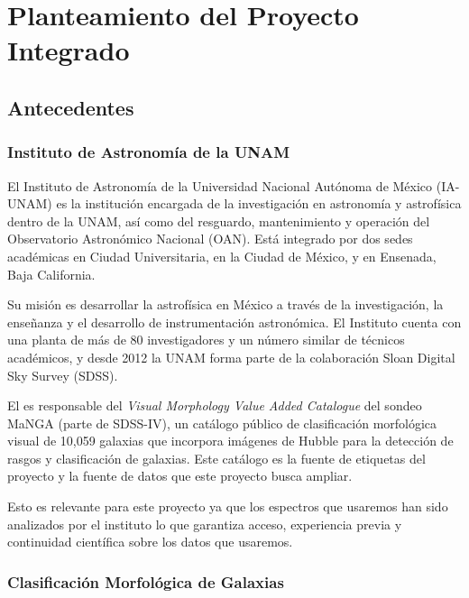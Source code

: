 \documentclass[12pt]{article}
\begin{document}
\section{Planteamiento del Proyecto Integrado}
\subsection{Antecedentes}
\subsubsection{Instituto de Astronomía de la UNAM}

El Instituto de Astronomía de la Universidad Nacional Autónoma de México (IA-UNAM) es la institución encargada de la investigación en astronomía y astrofísica dentro de la UNAM, así como del resguardo, mantenimiento y operación del Observatorio Astronómico Nacional (OAN). Está integrado por dos sedes académicas en Ciudad Universitaria, en la Ciudad de México, y en Ensenada, Baja California.

Su misión es desarrollar la astrofísica en México a través de la investigación, la enseñanza y el desarrollo de instrumentación astronómica. El Instituto cuenta con una planta de más de 80 investigadores y un número similar de técnicos académicos, y desde 2012 la UNAM forma parte de la colaboración Sloan Digital Sky Survey (SDSS).

El es responsable del \textit{Visual Morphology Value Added Catalogue} del sondeo MaNGA (parte de SDSS-IV), un catálogo público de clasificación morfológica visual de 10,059 galaxias que incorpora imágenes de Hubble para la detección de rasgos y clasificación de galaxias. Este catálogo es la fuente de etiquetas del proyecto y la fuente de datos que este proyecto busca ampliar.

Esto es relevante para este proyecto ya que los espectros que usaremos han sido analizados por el instituto lo que garantiza acceso, experiencia previa y continuidad científica sobre los datos que usaremos.

\subsubsection{Clasificación Morfológica de Galaxias}
\end{document}
